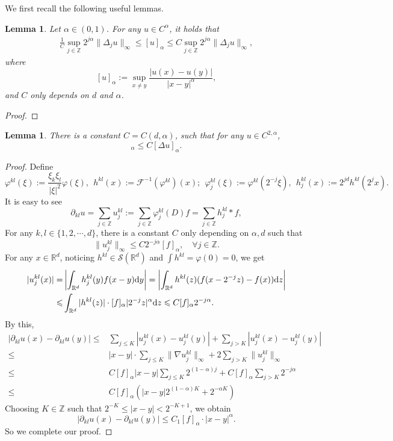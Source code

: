 \documentclass[twoside, 12pt]{book}
\numberwithin{equation}{chapter}
\newtheorem{lemma}[theorem]{Lemma}
\def\mR{{\mathbb R}}
\def\mZ{{\mathbb Z}}
\def\sF{{\mathscr F}}
\def\sS{{\mathscr S}}
\def\leq{\leqslant}
\def\p{\partial}
\def\d{\text{\rm{d}}}
\begin{document}
	We first recall the following useful lemmas. 
	\begin{lemma}
		Let $\alpha\in (0,1)$. For any $u\in C^\alpha$, it holds that 
		\begin{align}\label{Ch}
			\frac{1}{C}\sup_{j\in \mZ} 2^{j\alpha} \|\Delta_j u\|_\infty\leq [u]_{\alpha} \leq C \sup_{j\in \mZ} 2^{j\alpha} \|\Delta_j u\|_\infty, 
		\end{align}
		where 
		\[
		   [u]_\alpha:= \sup_{x\neq y} \frac{|u(x)-u(y)|}{|x-y|^\alpha}, 
		\]
		and $C$ only depends on $d$ and $\alpha$. 
	\end{lemma}
	\begin{proof}
		
	\end{proof}
	
	\begin{lemma}
		There is a constant $C=C(d, \alpha)$, such that for any $u\in C^{2,\alpha}$, 
		\begin{equation}
			[\nabla^2 u]_\alpha \leq C [\Delta u]_\alpha. 
		\end{equation}
	\end{lemma}
	\begin{proof}
		Define 
		$$
		\varphi^{kl} (\xi):= \frac{\xi_k\xi_l}{|\xi|^2} \varphi (\xi),\ \  h^{kl}(x):=\sF^{-1}(\varphi^{kl})(x);  \ \ \varphi^{kl}_j (\xi):= \varphi^{kl}(2^{-j}\xi), \ \ h^{kl}_j(x):=2^{jd} h^{kl}(2^jx). 
		$$
		It is easy to see
		$$
		\p_{kl}u=\sum_{j\in \mZ} u^{kl}_j:=\sum_{j\in \mZ}\varphi^{kl}_j (D) f=\sum_{j\in \mZ} h^{kl}_j* f, 
		$$
		For any $k,l\in \{1,2,\cdots, d\}$, there is a constant $C$ only depending on $\alpha, d$ such that 
		\begin{equation}
			\|u^{kl}_j\|_\infty\leq C 2^{-j\alpha} [f]_\alpha,\quad \forall j\in \mZ. 
		\end{equation}
		For any $x\in \mR^d$, noticing $h^{kl}\in \sS(\mR^d)$ and $\int h^{kl}=\varphi (0)=0$, we get 
		\begin{align*}
			|u^{kl}_j(x)|=&\left|\int_{\mR^d} h^{kl}_j (y)f(x-y) \d y\right|=\left|\int_{\mR^d} h^{kl} (z)(f(x-2^{-j}z)-f(x)) \d z\right| \\
			\leq&  \int_{\mR^d} |h^{kl}(z)| \cdot [f]_\alpha |2^{-j}z|^\alpha  \d z\leq C [f]_\alpha 2^{-j\alpha}. 
		\end{align*}
		By this, 
		\begin{align*}
			|\p_{kl}u(x)-\p_{kl}u(y)|\leq& \sum_{j\leq K} |u^{kl}_j(x)-u^{kl}_j(y)|+\sum_{j>K} |u^{kl}_j(x)-u^{kl}_j(y)|\\
			\leq &  |x-y|\cdot \sum_{j\leq K}   \|\nabla u^{kl}_j\|_\infty+2\sum_{j>K}  \|u^{kl}_j\|_\infty\\
			\leq & C [f]_\alpha |x-y| \sum_{j\leq K} 2^{(1-\alpha)j}+ C [f]_\alpha\sum_{j>K} 2^{-j\alpha}\\
			\leq & C [f]_\alpha \left(|x-y| 2^{(1-\alpha)K} + 2^{-\alpha K}\right)
		\end{align*}
		Choosing $K\in \mZ$ such that $2^{-K}\leq |x-y|<2^{-K+1}$, we obtain 
		$$
		|\p_{kl}u(x)-\p_{kl}u(y)|\leq C_1[f]_\alpha\cdot |x-y|^\alpha.  
		$$
		So we complete our proof. 
	\end{proof}
	
\end{document}
